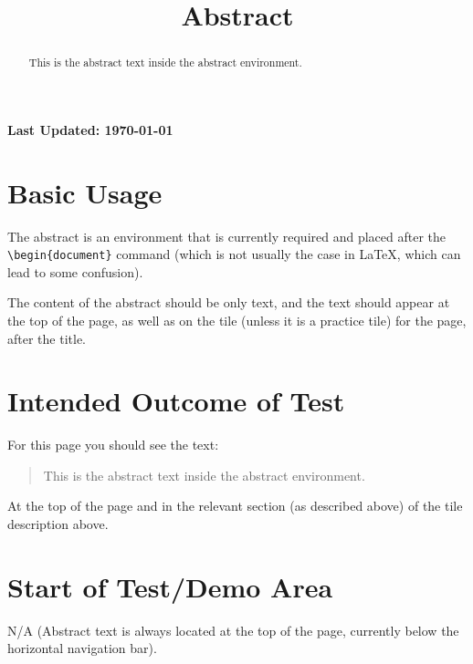 \documentclass{ximera}
\title{Abstract}
\begin{document}
\begin{abstract}
    This is the abstract text inside the abstract environment.
\end{abstract}
\maketitle

{{\Huge \bfseries Last Updated: \today}} \\


\section{Basic Usage}

The abstract is an environment that is currently required and placed after the \verb|\begin{document}| command 
(which is not usually the case in LaTeX, which can lead to some confusion).

The content of the abstract should be only text, and the text should appear at the top of the page,
as well as on the tile (unless it is a practice tile) for the page, after the title.

\section{Intended Outcome of Test}

For this page you should see the text:
\begin{quote}
    This is the abstract text inside the abstract environment.
\end{quote}
At the top of the page and in the relevant section (as described above) of the tile description above.

\section{Start of Test/Demo Area}
N/A (Abstract text is always located at the top of the page, currently below the horizontal navigation bar).

\hrulefill
\end{document}

